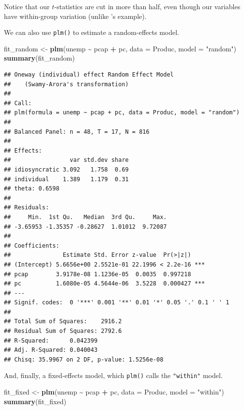\documentclass[
  12pt,
  oneside,openany]{book}
\newenvironment{Shaded}{\begin{snugshade}}{\end{snugshade}}
\newcommand{\DataTypeTok}[1]{\textcolor[rgb]{0.13,0.29,0.53}{#1}}
\newcommand{\KeywordTok}[1]{\textcolor[rgb]{0.13,0.29,0.53}{\textbf{#1}}}
\newcommand{\NormalTok}[1]{#1}
\newcommand{\OperatorTok}[1]{\textcolor[rgb]{0.81,0.36,0.00}{\textbf{#1}}}
\newcommand{\StringTok}[1]{\textcolor[rgb]{0.31,0.60,0.02}{#1}}
\begin{document}
Notice that our \(t\)-statistics are cut in more than half, even though our variables have within-group variation (unlike \citet{Moulton:1990bl}'s example).

We can also use \texttt{plm()} to estimate a random-effects model.

\begin{Shaded}
\begin{Highlighting}[]
\NormalTok{fit\_random \textless{}{-}}\StringTok{ }\KeywordTok{plm}\NormalTok{(unemp }\OperatorTok{\textasciitilde{}}\StringTok{ }\NormalTok{pcap }\OperatorTok{+}\StringTok{ }\NormalTok{pc,}
                  \DataTypeTok{data =}\NormalTok{ Produc,}
                  \DataTypeTok{model =} \StringTok{"random"}\NormalTok{)}
\KeywordTok{summary}\NormalTok{(fit\_random)}
\end{Highlighting}
\end{Shaded}

\begin{verbatim}
## Oneway (individual) effect Random Effect Model 
##    (Swamy-Arora's transformation)
## 
## Call:
## plm(formula = unemp ~ pcap + pc, data = Produc, model = "random")
## 
## Balanced Panel: n = 48, T = 17, N = 816
## 
## Effects:
##                 var std.dev share
## idiosyncratic 3.092   1.758  0.69
## individual    1.389   1.179  0.31
## theta: 0.6598
## 
## Residuals:
##     Min.  1st Qu.   Median  3rd Qu.     Max. 
## -3.65953 -1.35357 -0.28627  1.01012  9.72087 
## 
## Coefficients:
##               Estimate Std. Error z-value  Pr(>|z|)    
## (Intercept) 5.6656e+00 2.5521e-01 22.1996 < 2.2e-16 ***
## pcap        3.9178e-08 1.1236e-05  0.0035  0.997218    
## pc          1.6080e-05 4.5644e-06  3.5228  0.000427 ***
## ---
## Signif. codes:  0 '***' 0.001 '**' 0.01 '*' 0.05 '.' 0.1 ' ' 1
## 
## Total Sum of Squares:    2916.2
## Residual Sum of Squares: 2792.6
## R-Squared:      0.042399
## Adj. R-Squared: 0.040043
## Chisq: 35.9967 on 2 DF, p-value: 1.5256e-08
\end{verbatim}

And, finally, a fixed-effects model, which \texttt{plm()} calls the \texttt{"within"} model.

\begin{Shaded}
\begin{Highlighting}[]
\NormalTok{fit\_fixed \textless{}{-}}\StringTok{ }\KeywordTok{plm}\NormalTok{(unemp }\OperatorTok{\textasciitilde{}}\StringTok{ }\NormalTok{pcap }\OperatorTok{+}\StringTok{ }\NormalTok{pc,}
                 \DataTypeTok{data =}\NormalTok{ Produc,}
                 \DataTypeTok{model =} \StringTok{"within"}\NormalTok{)}
\KeywordTok{summary}\NormalTok{(fit\_fixed)}
\end{Highlighting}
\end{Shaded}
\end{document}

